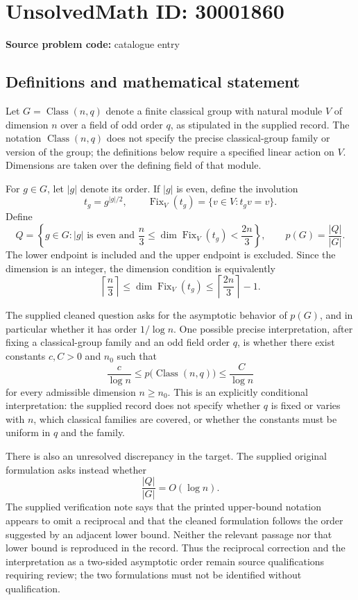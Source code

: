 \documentclass[11pt]{article}
\begin{document}
\section*{UnsolvedMath ID: 30001860}
\textbf{Source problem code:} catalogue entry
\subsection{Definitions and mathematical statement}
Let \(G=\operatorname{Class}(n,q)\) denote a finite classical group with natural module \(V\) of dimension \(n\) over a field of odd order \(q\), as stipulated in the supplied record. The notation \(\operatorname{Class}(n,q)\) does not specify the precise classical-group family or version of the group; the definitions below require a specified linear action on \(V\). Dimensions are taken over the defining field of that module.

For \(g\in G\), let \(|g|\) denote its order. If \(|g|\) is even, define the involution
\[
 t_g=g^{|g|/2},\qquad \operatorname{Fix}_V(t_g)=\{v\in V:t_gv=v\}.
\]
Define
\[
 Q=\left\{g\in G: |g|\text{ is even and }\frac n3\leq \dim\operatorname{Fix}_V(t_g)<\frac{2n}{3}\right\},
 \qquad p(G)=\frac{|Q|}{|G|}.
\]
The lower endpoint is included and the upper endpoint is excluded. Since the dimension is an integer, the dimension condition is equivalently
\[
 \left\lceil\frac n3\right\rceil\leq\dim\operatorname{Fix}_V(t_g)\leq\left\lceil\frac{2n}{3}\right\rceil-1.
\]

The supplied cleaned question asks for the asymptotic behavior of \(p(G)\), and in particular whether it has order \(1/\log n\). One possible precise interpretation, after fixing a classical-group family and an odd field order \(q\), is whether there exist constants \(c,C>0\) and \(n_0\) such that
\[
 \frac{c}{\log n}\leq p\bigl(\operatorname{Class}(n,q)\bigr)\leq\frac{C}{\log n}
\]
for every admissible dimension \(n\geq n_0\). This is an explicitly conditional interpretation: the supplied record does not specify whether \(q\) is fixed or varies with \(n\), which classical families are covered, or whether the constants must be uniform in \(q\) and the family.

There is also an unresolved discrepancy in the target. The supplied original formulation asks instead whether
\[
 \frac{|Q|}{|G|}=O(\log n).
\]
The supplied verification note says that the printed upper-bound notation appears to omit a reciprocal and that the cleaned formulation follows the order suggested by an adjacent lower bound. Neither the relevant passage nor that lower bound is reproduced in the record. Thus the reciprocal correction and the interpretation as a two-sided asymptotic order remain source qualifications requiring review; the two formulations must not be identified without qualification.
\end{document}
